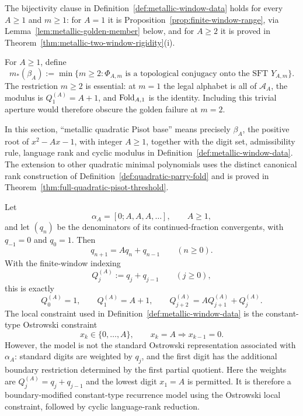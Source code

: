 The bijectivity clause in Definition~\ref{def:metallic-window-data} holds for
every $A\ge1$ and $m\ge1$: for $A=1$ it is
Proposition~\ref{prop:finite-window-range}, via
Lemma~\ref{lem:metallic-golden-member} below, and for $A\ge2$ it is proved in
Theorem~\ref{thm:metallic-two-window-rigidity}(i).

\begin{definition}
\label{def:metallic-conjugacy-threshold}
For $A\ge1$, define
\[
m_*(\beta_A):=\min\{m\ge2:\Phi_{A,m}\text{ is a topological conjugacy
onto the SFT }Y_{A,m}\}.
\]
The restriction $m\ge2$ is essential: at $m=1$ the legal alphabet is all of
$\mathcal A_A$, the modulus is $Q_1^{(A)}=A+1$, and $\mathrm{Fold}_{A,1}$ is the
identity.  Including this trivial aperture would therefore obscure the
golden failure at $m=2$.
\end{definition}

\begin{remark}
\label{rem:metallic-beta-scope}
In this section, ``metallic quadratic Pisot base'' means precisely
$\beta_A$, the positive root of $x^2-Ax-1$, with integer $A\ge1$, together
with the digit set, admissibility rule, language rank and cyclic modulus in
Definition~\ref{def:metallic-window-data}.  The extension to other quadratic
minimal polynomials uses the distinct canonical rank construction of
Definition~\ref{def:quadratic-parry-fold} and is proved in
Theorem~\ref{thm:full-quadratic-pisot-threshold}.
\end{remark}

\begin{lemma}
\label{lem:constant-type-ostrowski-origin}
Let
\[
\alpha_A=[0;A,A,A,\ldots],\qquad A\ge1,
\]
and let $(q_n)$ be the denominators of its continued-fraction convergents, with
$q_{-1}=0$ and $q_0=1$. Then
\[
q_{n+1}=Aq_n+q_{n-1}\qquad(n\ge0).
\]
With the finite-window indexing
\[
Q_j^{(A)}:=q_j+q_{j-1}\qquad(j\ge0),
\]
this is exactly
\[
Q_0^{(A)}=1,\qquad Q_1^{(A)}=A+1,\qquad
Q_{j+2}^{(A)}=AQ_{j+1}^{(A)}+Q_j^{(A)}.
\]
The local constraint used in Definition~\ref{def:metallic-window-data} is the
constant-type Ostrowski constraint
\[
x_k\in\{0,\ldots,A\},\qquad x_k=A\Rightarrow x_{k-1}=0 .
\]
However, the model is not the standard Ostrowski representation associated
with $\alpha_A$: standard digits are weighted by $q_j$, and the first digit
has the additional boundary restriction determined by the first partial
quotient.  Here the weights are $Q_j^{(A)}=q_j+q_{j-1}$ and the lowest digit
$x_1=A$ is permitted.  It is therefore a boundary-modified constant-type
recurrence model using the Ostrowski local constraint, followed by cyclic
language-rank reduction.
\end{lemma}

